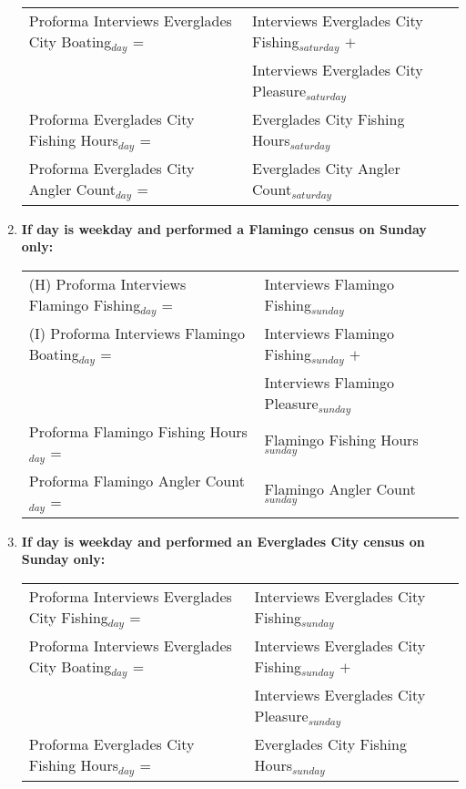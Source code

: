 \documentclass[letterpaper,12pt]{article}
\begin{document}
\begin{enumerate}
\begin{tabular}{l@{ }l@{ }l}
	Proforma Interviews Everglades City Boating$_{day}$ =
		& Interviews Everglades City Fishing$_{saturday}$ $+$ \\
		& Interviews Everglades City Pleasure$_{saturday}$ \\

	Proforma Everglades City Fishing Hours$_{day}$ =
		& Everglades City Fishing Hours$_{saturday}$ \\

	Proforma Everglades City Angler Count$_{day}$ =
		& Everglades City Angler Count$_{saturday}$ \\
\end{tabular}

\item
\textbf{If day is weekday and performed a Flamingo census on Sunday only:} \\
\begin{tabular}{l@{ }l@{ }l}
	(H) Proforma Interviews Flamingo Fishing$_{day}$ =
		& Interviews Flamingo Fishing$_{sunday}$ \\

	(I) Proforma Interviews Flamingo Boating$_{day}$ =
		& Interviews Flamingo Fishing$_{sunday}$ $+$ \\
		& Interviews Flamingo Pleasure$_{sunday}$ \\

	Proforma Flamingo Fishing Hours$_{day}$ =
		& Flamingo Fishing Hours$_{sunday}$ \\

	Proforma Flamingo Angler Count$_{day}$ =
		& Flamingo Angler Count$_{sunday}$ \\
\end{tabular}

\item
\textbf{If day is weekday and performed an Everglades City census on Sunday only:} \\
\begin{tabular}{l@{ }l@{ }l}
	Proforma Interviews Everglades City Fishing$_{day}$ =
		& Interviews Everglades City Fishing$_{sunday}$ \\

	Proforma Interviews Everglades City Boating$_{day}$ =
		& Interviews Everglades City Fishing$_{sunday}$ $+$ \\
		& Interviews Everglades City Pleasure$_{sunday}$ \\

	Proforma Everglades City Fishing Hours$_{day}$ =
		& Everglades City Fishing Hours$_{sunday}$ \\


\end{tabular}
\end{enumerate}
\end{document}
